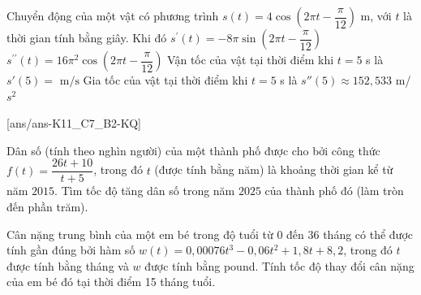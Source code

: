 \begin{ex}%
Chuyển động của một vật có phương trình $s(t)=4\cos\left(2\pi t-\dfrac{\pi}{12}\right)$ m, với $t$ là thời gian tính bằng giây. Khi đó
\choiceTF
{\True $s^{\prime}(t)=-8\pi\sin\left(2\pi t-\dfrac{\pi}{12}\right)$}
{$s^{\prime\prime}(t)=16\pi^2\cos\left(2\pi t-\dfrac{\pi}{12}\right)$}
{\True Vận tốc của vật tại thời điểm khi $t=5$ s là 
$s'(5)= \text{ m/s}$}
{Gia tốc của vật tại thời điểm khi $t=5$ s là $s''(5)\approx 152,533$ m/$s^2$}
\end{ex}



[ans/ans-K11_C7_B2-KQ]
\caukq

\begin{ex}%
	Dân số (tính theo nghìn người) của một thành phố được cho bởi công thức $f(t)=\dfrac{26 t+10}{t+5}$, trong đó $t$ (được tính bằng năm) là khoảng thời gian kể từ năm $2015$. Tìm tốc độ tăng dân số trong năm $2025$ của thành phố đó (làm tròn đến phần trăm).
\end{ex}

\begin{ex}%
Cân nặng trung bình của một em bé trong độ tuổi từ 0 đến 36 tháng có thể được tính gần đúng bởi hàm số $w(t)=0,00076 t^3-0,06 t^2+1,8 t+8,2$, trong đó $t$ được tính bằng tháng và $w$ được tính bằng pound. Tính tốc độ thay đổi cân nặng của em bé đó tại thời điểm 15 tháng tuổi.\\
\end{ex}

